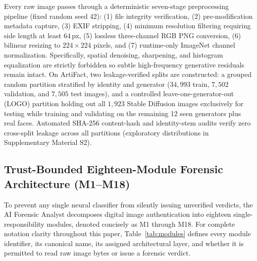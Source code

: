 \documentclass[final,5p,times,twocolumn,numafflabel]{elsarticle}
\begin{document}
Every raw image passes through a deterministic seven-stage preprocessing pipeline (fixed random seed 42): (1) file integrity verification, (2) pre-modification metadata capture, (3) EXIF stripping, (4) minimum resolution filtering requiring side length at least $64$\,px, (5) lossless three-channel RGB PNG conversion, (6) bilinear resizing to $224\times 224$ pixels, and (7) runtime-only ImageNet channel normalization. Specifically, spatial denoising, sharpening, and histogram equalization are strictly forbidden so subtle high-frequency generative residuals remain intact. On ArtiFact, two leakage-verified splits are constructed: a grouped random partition stratified by identity and generator ($34{,}993$ train, $7{,}502$ validation, and $7{,}505$ test images), and a controlled leave-one-generator-out (LOGO) partition holding out all $1{,}923$ Stable Diffusion images exclusively for testing while training and validating on the remaining 12 seen generators plus real faces. Automated SHA-256 content-hash and identity-stem audits verify zero cross-split leakage across all partitions (exploratory distributions in Supplementary Material S2).

\subsection{Trust-Bounded Eighteen-Module Forensic Architecture (M1--M18)}
\label{subsec:architecture}

To prevent any single neural classifier from silently issuing unverified verdicts, the AI Forensic Analyst decomposes digital image authentication into eighteen single-responsibility modules, denoted concisely as M1 through M18. For complete notation clarity throughout this paper, Table~\ref{tab:modules} defines every module identifier, its canonical name, its assigned architectural layer, and whether it is permitted to read raw image bytes or issue a forensic verdict.
\end{document}
